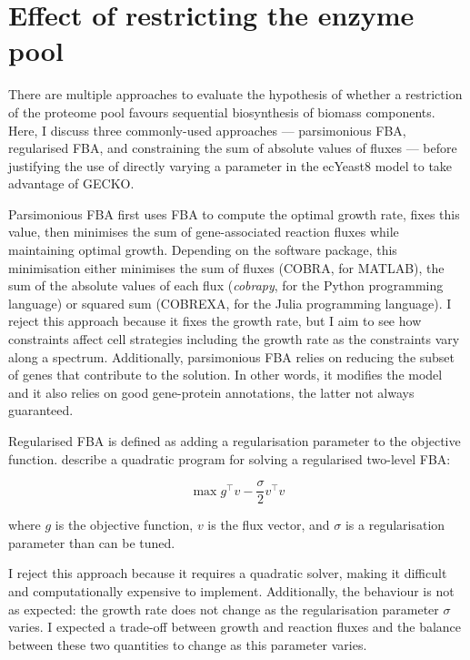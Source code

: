 \section{Effect of restricting the enzyme pool}
\label{sec:model-pool}

There are multiple approaches to evaluate the hypothesis of whether a restriction of the proteome pool favours sequential biosynthesis of biomass components.
Here, I discuss three commonly-used approaches --- parsimonious FBA, regularised FBA, and constraining the sum of absolute values of fluxes --- before justifying the use of directly varying a parameter in the ecYeast8 model to take advantage of GECKO.

Parsimonious FBA \parencite{lewisOmicDataEvolved2010} first uses FBA to compute the optimal growth rate, fixes this value, then minimises the sum of gene-associated reaction fluxes while maintaining optimal growth.
Depending on the software package, this minimisation either minimises the sum of fluxes (COBRA, for MATLAB), the sum of the absolute values of each flux (\textit{cobrapy}, for the Python programming language) or squared sum (COBREXA, for the Julia programming language).
I reject this approach because it fixes the growth rate, but I aim to see how constraints affect cell strategies including the growth rate as the constraints vary along a spectrum.
Additionally, parsimonious FBA relies on reducing the subset of genes that contribute to the solution.
In other words, it modifies the model and it also relies on good gene-protein annotations, the latter not always guaranteed.

Regularised FBA is defined as adding a regularisation parameter to the objective function.
\textcite{vijayakumarHybridFluxBalance2020} describe a quadratic program for solving a regularised two-level FBA:

\begin{equation}
  \max g^\intercal v - \frac{\sigma}{2}v^\intercal v
  \label{eq:model-regularised-fba}
\end{equation}

where $g$ is the objective function, $v$ is the flux vector, and $\sigma$ is a regularisation parameter than can be tuned.

I reject this approach because it requires a quadratic solver, making it difficult and computationally expensive to implement.
Additionally, the behaviour is not as expected: the growth rate does not change as the regularisation parameter $\sigma$ varies.
I expected a trade-off between growth and reaction fluxes and the balance between these two quantities to change as this parameter varies.


